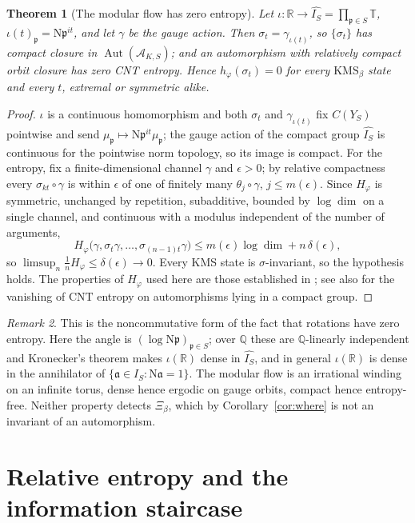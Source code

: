 \documentclass[11pt]{amsart}
\numberwithin{equation}{section}
\newtheorem{theorem}{Theorem}[section]
\theoremstyle{definition}
\theoremstyle{remark}
\newtheorem{remark}[theorem]{Remark}
\newcommand{\Q}{\mathbb{Q}}
\newcommand{\R}{\mathbb{R}}
\newcommand{\T}{\mathbb{T}}
\newcommand{\cA}{\mathcal{A}}
\newcommand{\pp}{\mathfrak{p}}
\newcommand{\aaa}{\mathfrak{a}}
\newcommand{\Ns}{\mathrm{N}}
\newcommand{\Aut}{\operatorname{Aut}}
\begin{document}
\begin{theorem}[The modular flow has zero entropy]\label{thm:cnt}
Let $\iota:\R\to\widehat{I_S}=\prod_{\pp\in S}\T$, $\iota(t)_\pp=\Ns\pp^{it}$, and let
$\gamma$ be the gauge action. Then $\sigma_t=\gamma_{\iota(t)}$, so $\{\sigma_t\}$ has
compact closure in $\Aut(\cA_{K,S})$; and an automorphism with relatively compact orbit
closure has zero CNT entropy. Hence $h_\varphi(\sigma_t)=0$ for every $\mathrm{KMS}_\beta$
state and every $t$, extremal or symmetric alike.
\end{theorem}

\begin{proof}
$\iota$ is a continuous homomorphism and both $\sigma_t$ and $\gamma_{\iota(t)}$ fix
$C(Y_S)$ pointwise and send $\mu_\pp\mapsto\Ns\pp^{it}\mu_\pp$; the gauge action of the
compact group $\widehat{I_S}$ is continuous for the pointwise norm topology, so its image is
compact. For the entropy, fix a finite-dimensional channel $\gamma$ and $\epsilon>0$; by
relative compactness every $\sigma_{kt}\circ\gamma$ is within $\epsilon$ of one of finitely
many $\theta_j\circ\gamma$, $j\le m(\epsilon)$. Since $H_\varphi$ is symmetric, unchanged by
repetition, subadditive, bounded by $\log\dim$ on a single channel, and continuous with a
modulus independent of the number of arguments,
\[
H_\varphi\bigl(\gamma,\sigma_t\gamma,\dots,\sigma_{(n-1)t}\gamma\bigr)\le m(\epsilon)\log\dim+n\,\delta(\epsilon),
\]
so $\limsup_n\frac1nH_\varphi\le\delta(\epsilon)\to0$. Every KMS state is $\sigma$-invariant,
so the hypothesis holds. The properties of $H_\varphi$ used here are those established in
\cite{CNT}; see also \cite{OP} for the vanishing of $\mathrm{CNT}$ entropy on automorphisms
lying in a compact group.
\end{proof}

\begin{remark}\label{rem:rotation}
This is the noncommutative form of the fact that rotations have zero entropy. Here the
angle is $(\log\Ns\pp)_{\pp\in S}$; over $\Q$ these are $\Q$-linearly independent and
Kronecker's theorem makes $\iota(\R)$ dense in $\widehat{I_S}$, and in general $\iota(\R)$
is dense in the annihilator of $\{\aaa\in I_S:\Ns\aaa=1\}$. The modular flow is an
irrational winding on an infinite torus, dense hence ergodic on gauge orbits, compact hence
entropy-free. Neither property detects
$\Xi_\beta$, which by Corollary~\ref{cor:where} is not an invariant of an automorphism.
\end{remark}

\section{Relative entropy and the information staircase}\label{sec:relent}
\end{document}
